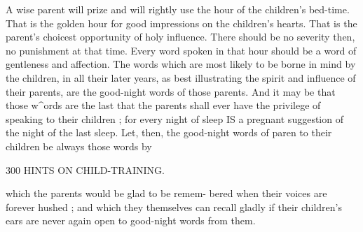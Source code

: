 \documentclass[
]{book}
\begin{document}
A wise parent will prize and will rightly use the hour of the children's bed-time. That is the golden hour for good impressions on the children's hearts. That is the parent's choicest opportunity of holy influence. There should be no severity then, no punishment at that time. Every word spoken in that hour should be a word of gentleness and affection. The words which are most likely to be borne in mind by the children, in all their later years, as best illustrating the spirit and influence of their parents, are the good-night words of those parents. And it may be that those w\^{}ords are the last that the parents shall ever have the privilege of speaking to their children ; for every night of sleep IS a pregnant suggestion of the night of the last sleep. Let, then, the good-night words of paren to their children be always those words by

300 HINTS ON CHILD-TRAINING.

which the parents would be glad to be remem- bered when their voices are forever hushed ; and which they themselves can recall gladly if their children's ears are never again open to good-night words from them.
\end{document}
